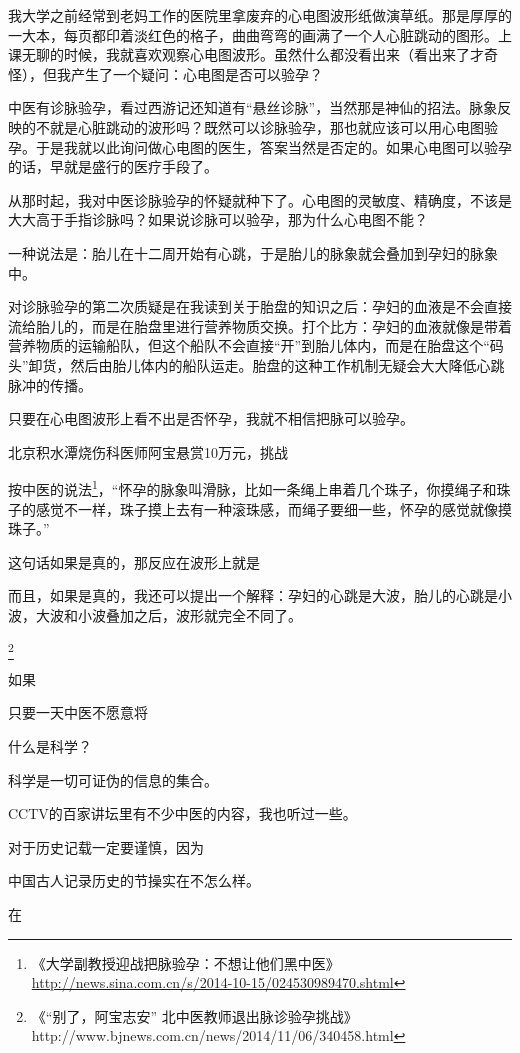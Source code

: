 我大学之前经常到老妈工作的医院里拿废弃的心电图波形纸做演草纸。那是厚厚的一大本，每页都印着淡红色的格子，曲曲弯弯的画满了一个人心脏跳动的图形。上课无聊的时候，我就喜欢观察心电图波形。虽然什么都没看出来（看出来了才奇怪），但我产生了一个疑问：心电图是否可以验孕？

中医有诊脉验孕，看过西游记还知道有“悬丝诊脉”，当然那是神仙的招法。脉象反映的不就是心脏跳动的波形吗？既然可以诊脉验孕，那也就应该可以用心电图验孕。于是我就以此询问做心电图的医生，答案当然是否定的。如果心电图可以验孕的话，早就是盛行的医疗手段了。

从那时起，我对中医诊脉验孕的怀疑就种下了。心电图的灵敏度、精确度，不该是大大高于手指诊脉吗？如果说诊脉可以验孕，那为什么心电图不能？

一种说法是：胎儿在十二周开始有心跳，于是胎儿的脉象就会叠加到孕妇的脉象中。

对诊脉验孕的第二次质疑是在我读到关于胎盘的知识之后：孕妇的血液是不会直接流给胎儿的，而是在胎盘里进行营养物质交换。打个比方：孕妇的血液就像是带着营养物质的运输船队，但这个船队不会直接“开”到胎儿体内，而是在胎盘这个“码头”卸货，然后由胎儿体内的船队运走。胎盘的这种工作机制无疑会大大降低心跳脉冲的传播。

只要在心电图波形上看不出是否怀孕，我就不相信把脉可以验孕。


北京积水潭烧伤科医师阿宝悬赏10万元，挑战

按中医的说法\footnote{《大学副教授迎战把脉验孕：不想让他们黑中医》 \url{http://news.sina.com.cn/s/2014-10-15/024530989470.shtml}}，“怀孕的脉象叫滑脉，比如一条绳上串着几个珠子，你摸绳子和珠子的感觉不一样，珠子摸上去有一种滚珠感，而绳子要细一些，怀孕的感觉就像摸珠子。”

这句话如果是真的，那反应在波形上就是

而且，如果是真的，我还可以提出一个解释：孕妇的心跳是大波，胎儿的心跳是小波，大波和小波叠加之后，波形就完全不同了。

\footnote{《“别了，阿宝志安” 北中医教师退出脉诊验孕挑战》 http://www.bjnews.com.cn/news/2014/11/06/340458.html}

如果

只要一天中医不愿意将

什么是科学？

科学是一切可证伪的信息的集合。

CCTV的百家讲坛里有不少中医的内容，我也听过一些。

对于历史记载一定要谨慎，因为

中国古人记录历史的节操实在不怎么样。


在